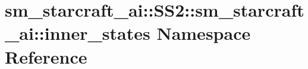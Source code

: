 \hypertarget{namespacesm__starcraft__ai_1_1SS2_1_1sm__starcraft__ai_1_1inner__states}{}\section{sm\+\_\+starcraft\+\_\+ai\+:\+:S\+S2\+:\+:sm\+\_\+starcraft\+\_\+ai\+:\+:inner\+\_\+states Namespace Reference}
\label{namespacesm__starcraft__ai_1_1SS2_1_1sm__starcraft__ai_1_1inner__states}
